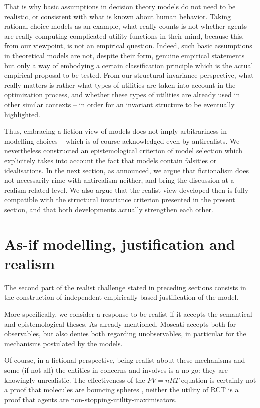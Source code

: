 \documentclass[a4paper,11pt]{article}
\theoremstyle{definition}
\begin{document}
That is why basic assumptions in decision theory models do not need to be realistic, or consistent with what is known about human behavior. Taking rational choice models as an example, what really counts is not whether agents are really computing complicated utility functions in their mind, because this, from our viewpoint, is not an empirical question. Indeed, such basic assumptions in theoretical models are not, despite their form, genuine empirical statements but only a way of embodying a certain classification principle which is the actual empirical proposal to be tested. From our structural invariance perspective, what really matters is rather what types of utilities are taken into account in the optimization process, and whether these types of utilities are already used in other similar contexts -- in order for an invariant structure to be eventually highlighted. 

Thus, embracing a fiction view of models does not imply arbitrariness in modelling choices -- which is of course acknowledged even by antirealists. We nevertheless constructed an epistemological criterion of model selection which explicitely takes into account the fact that models contain falsities or idealisations. In the next section, as announced, we argue that fictionalism does not necessarily rime with antirealism neither, and bring the discussion at a realism-related level. We also argue that the realist view developed then is fully compatible with the structural invariance criterion presented in the present section, and that both developments actually strengthen each other.

\section{As-if modelling, justification and realism}
\label{sec:asif_realism}

The second part of the realist challenge stated in preceding sections consists in the construction of independent empirically based justification of the model.

More specifically, we consider a response to be realist if it accepts the semantical and epistemological theses. As already mentioned, Moscati accepts both for observables, but also denies both regarding unobservables, in particular for the mechanisms postulated by the models.

Of course, in a fictional perspective, being realist about these mechanisms and some (if not all) the entities in concerns and involves is a no-go: they are knowingly unrealistic. The effectiveness of the $PV=nRT$ equation is certainly not a proof that molecules are bouncing spheres  {\color{red}{encore ici}}, neither the utility of RCT is a proof that agents are non-stopping-utility-maximisators.
\end{document}
